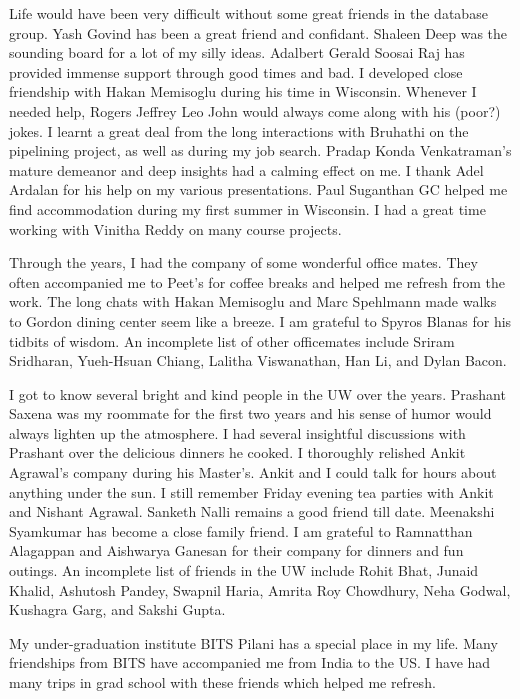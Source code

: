 Life would have been very difficult without some great friends in the database group. 
Yash Govind has been a great friend and confidant.
Shaleen Deep was the sounding board for a lot of my silly ideas.
Adalbert Gerald Soosai Raj has provided immense support through good times and bad. 
I developed close friendship with Hakan Memisoglu during his time in Wisconsin.
Whenever I needed help, Rogers Jeffrey Leo John would always come along with his (poor?) jokes. 
I learnt a great deal from the long interactions with Bruhathi on the pipelining project, as well as during my job search.
Pradap Konda Venkatraman's mature demeanor and deep insights had a calming effect on me.
I thank Adel Ardalan for his help on my various presentations. 
Paul Suganthan GC helped me find accommodation during my first summer in Wisconsin. 
I had a great time working with Vinitha Reddy on many course projects.

Through the years, I had the company of some wonderful office mates. 
They often accompanied me to Peet's for coffee breaks and helped me refresh from the work.
The long chats with Hakan Memisoglu and Marc Spehlmann made walks to Gordon dining center seem like a breeze.
I am grateful to Spyros Blanas for his tidbits of wisdom. 
An incomplete list of other officemates include Sriram Sridharan, Yueh-Hsuan Chiang, Lalitha Viswanathan, Han Li, and Dylan Bacon.

I got to know several bright and kind people in the UW over the years. 
Prashant Saxena was my roommate for the first two years and his sense of humor would always lighten up the atmosphere. 
I had several insightful discussions with Prashant over the delicious dinners he cooked. 
I thoroughly relished Ankit Agrawal's company during his Master's.
Ankit and I could talk for hours about anything under the sun.
I still remember Friday evening tea parties with Ankit and Nishant Agrawal. 
Sanketh Nalli remains a good friend till date.
Meenakshi Syamkumar has become a close family friend. 
I am grateful to Ramnatthan Alagappan and Aishwarya Ganesan for their company for dinners and fun outings.
An incomplete list of friends in the UW include Rohit Bhat, Junaid Khalid, Ashutosh Pandey, Swapnil Haria, Amrita Roy Chowdhury, Neha Godwal, Kushagra Garg, and Sakshi Gupta. 

My under-graduation institute BITS Pilani has a special place in my life.
Many friendships from BITS have accompanied me from India to the US. 
I have had many trips in grad school with these friends which helped me refresh.

